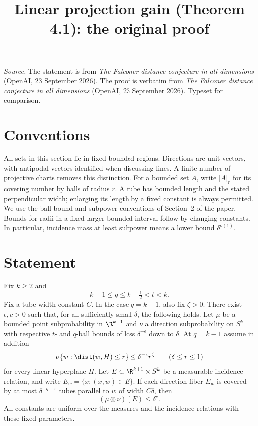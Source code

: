 \documentclass[11pt,reqno]{amsart}
\title{Linear projection gain (Theorem 4.1): the original proof}
\begin{document}
\maketitle
\noindent\emph{Source.} The statement is from \emph{The Falconer distance conjecture in all dimensions} (OpenAI, 23 September 2026). The proof is verbatim from \emph{The Falconer distance conjecture in all dimensions} (OpenAI, 23 September 2026). Typeset for comparison.

\section*{Conventions}
All sets in this section lie in fixed bounded regions. Directions are unit
vectors, with antipodal vectors identified when discussing lines. A finite
number of projective charts removes this distinction. For a bounded set
$A$, write $|A|_r$ for its covering number by balls of radius $r$. A tube has
bounded length and the stated perpendicular width; enlarging its length by
a fixed constant is always permitted. We use the ball-bound and subpower
conventions of Section~2 of the paper. Bounds for radii in a fixed
larger bounded interval follow by changing constants. In particular,
incidence mass at least subpower means a lower bound $\delta^{o(1)}$.

\section*{Statement}
\begin{theorem}\label{ang:linear-gain}
Fix $k\ge2$ and
\[
 k-1\le q\le k-\tfrac12<t<k.
\]
Fix a tube-width constant $C$. In the case $q=k-1$, also fix
$\zeta>0$. There exist $\epsilon,c>0$ such that, for all sufficiently
small $\delta$, the following holds. Let $\mu$ be a bounded point
subprobability in $\R^{k+1}$ and $\nu$ a direction subprobability on $S^k$
with respective $t$- and $q$-ball bounds of loss $\delta^{-\epsilon}$
down to $\delta$. At $q=k-1$ assume in addition
\begin{equation}\label{ang:endpoint-plate}
 \nu\{w:\dist(w,H)\le r\}\le\delta^{-\epsilon}r^\zeta
       \qquad(\delta\le r\le1)
\end{equation}
for every linear hyperplane $H$. Let $E\subset\R^{k+1}\times S^k$ be a
measurable incidence relation, and write $E_w=\{x:(x,w)\in E\}$.
If each direction fiber $E_w$ is covered by at most
$\delta^{-q-\epsilon}$ tubes parallel to $w$ of width $C\delta$, then
\[
 (\mu\otimes\nu)(E)\le\delta^c.
\]
All constants are uniform over the measures and the incidence relations
with these fixed parameters.
\end{theorem}
\end{document}

